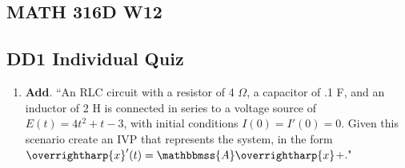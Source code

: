 \documentclass[11pt]{article}
\begin{document}
\begin{center}\section*{MATH 316D W12}\end{center}
\subsection*{DD1 Individual Quiz}

\begin{enumerate}
	\item \textbf{Add}. ``An RLC circuit with a resistor of 4 $\Omega$, a capacitor of .1 F, and an inductor of 2 H is connected in series to a voltage source of $E(t)=4t^2+t-3$, with initial conditions $I(0)=I'(0)=0$. Given this scenario create an IVP that represents the system, in the form \(\overrightharp{x}'(t)=\mathbbmss{A}\overrightharp{x}\)+."
	

\end{enumerate}
\end{document}

